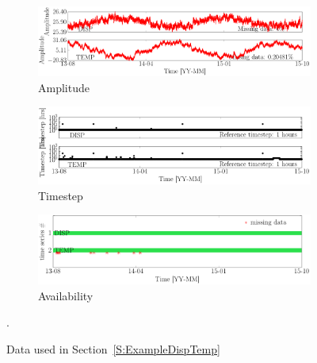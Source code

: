 \begin{figure}[h!]
\centering
\begin{subfigure}{\linewidth}
\includegraphics[width=0.9\linewidth]{./docfigs/Example_DISPTEMPSIM/raw/ALL_AMPLITUDES.pdf} 
\caption{Amplitude}
\end{subfigure}
\begin{subfigure}{\linewidth}
\includegraphics[width=0.9\linewidth]{./docfigs/Example_DISPTEMPSIM/raw/ALL_TIMESTEPS.pdf}
\caption{Timestep}
\end{subfigure}
\begin{subfigure}{\linewidth}
\includegraphics[width=0.9\linewidth]{./docfigs/Example_DISPTEMPSIM/raw/AVAILABILITY.pdf}
\caption{Availability}
\end{subfigure}
\caption{Data used in Section~\ref{S:ExampleDispTemp}}.
\label{fig:DataSummaryRaw2}
\end{figure}

